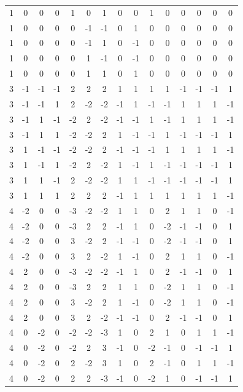 \documentclass[aps,english,superscriptaddress,onecolumn,twoside,longbibliography,pra,floatfix,fleqn,nofootinbib]{revtex4-1}%
\theoremstyle{definition}
\begin{document}
{\begin{table}[hb]
{\begin{tabular}{c@{\hspace{1em}}ccc@{\hspace{1em}}ccc@{\hspace{1em}}c@{\hspace{1em}}ccc@{\hspace{1em}}ccc@{\hspace{1em}}c}
 1 & 0 & 0 & 0 & 1 & 0 & 1 & 0 & 0 & 1 & 0 & 0 & 0 & 0 & 0 \\
 1 & 0 & 0 & 0 & 0 & -1 & -1 & 0 & 1 & 0 & 0 & 0 & 0 & 0 & 0 \\
 1 & 0 & 0 & 0 & 0 & -1 & 1 & 0 & -1 & 0 & 0 & 0 & 0 & 0 & 0 \\
 1 & 0 & 0 & 0 & 0 & 1 & -1 & 0 & -1 & 0 & 0 & 0 & 0 & 0 & 0 \\
 1 & 0 & 0 & 0 & 0 & 1 & 1 & 0 & 1 & 0 & 0 & 0 & 0 & 0 & 0 \\
 3 & -1 & -1 & -1 & 2 & 2 & 2 & 1 & 1 & 1 & 1 & -1 & -1 & -1 & 1 \\
 3 & -1 & -1 & 1 & 2 & -2 & -2 & -1 & 1 & -1 & -1 & 1 & 1 & 1 & -1 \\
 3 & -1 & 1 & -1 & -2 & 2 & -2 & -1 & -1 & 1 & -1 & 1 & 1 & 1 & -1 \\
 3 & -1 & 1 & 1 & -2 & -2 & 2 & 1 & -1 & -1 & 1 & -1 & -1 & -1 & 1 \\
 3 & 1 & -1 & -1 & -2 & -2 & 2 & -1 & -1 & -1 & 1 & 1 & 1 & 1 & -1 \\
 3 & 1 & -1 & 1 & -2 & 2 & -2 & 1 & -1 & 1 & -1 & -1 & -1 & -1 & 1 \\
 3 & 1 & 1 & -1 & 2 & -2 & -2 & 1 & 1 & -1 & -1 & -1 & -1 & -1 & 1 \\
 3 & 1 & 1 & 1 & 2 & 2 & 2 & -1 & 1 & 1 & 1 & 1 & 1 & 1 & -1 \\
 4 & -2 & 0 & 0 & -3 & -2 & -2 & 1 & 1 & 0 & 2 & 1 & 1 & 0 & -1 \\
 4 & -2 & 0 & 0 & -3 & 2 & 2 & -1 & 1 & 0 & -2 & -1 & -1 & 0 & 1 \\
 4 & -2 & 0 & 0 & 3 & -2 & 2 & -1 & -1 & 0 & -2 & -1 & -1 & 0 & 1 \\
 4 & -2 & 0 & 0 & 3 & 2 & -2 & 1 & -1 & 0 & 2 & 1 & 1 & 0 & -1 \\
 4 & 2 & 0 & 0 & -3 & -2 & -2 & -1 & 1 & 0 & 2 & -1 & -1 & 0 & 1 \\
 4 & 2 & 0 & 0 & -3 & 2 & 2 & 1 & 1 & 0 & -2 & 1 & 1 & 0 & -1 \\
 4 & 2 & 0 & 0 & 3 & -2 & 2 & 1 & -1 & 0 & -2 & 1 & 1 & 0 & -1 \\
 4 & 2 & 0 & 0 & 3 & 2 & -2 & -1 & -1 & 0 & 2 & -1 & -1 & 0 & 1 \\
 4 & 0 & -2 & 0 & -2 & -2 & -3 & 1 & 0 & 2 & 1 & 0 & 1 & 1 & -1 \\
 4 & 0 & -2 & 0 & -2 & 2 & 3 & -1 & 0 & -2 & -1 & 0 & -1 & -1 & 1 \\
 4 & 0 & -2 & 0 & 2 & -2 & 3 & 1 & 0 & 2 & -1 & 0 & 1 & 1 & -1 \\
 4 & 0 & -2 & 0 & 2 & 2 & -3 & -1 & 0 & -2 & 1 & 0 & -1 & -1 & 1 \\

\end{tabular}}
\end{table}}
\end{document}
